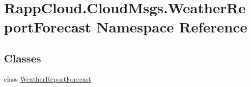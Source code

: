 \hypertarget{namespaceRappCloud_1_1CloudMsgs_1_1WeatherReportForecast}{\section{Rapp\-Cloud.\-Cloud\-Msgs.\-Weather\-Report\-Forecast Namespace Reference}
\label{namespaceRappCloud_1_1CloudMsgs_1_1WeatherReportForecast}
}
\subsection*{Classes}
\begin{DoxyCompactItemize}
\item 
class \hyperlink{classRappCloud_1_1CloudMsgs_1_1WeatherReportForecast_1_1WeatherReportForecast}{Weather\-Report\-Forecast}
\end{DoxyCompactItemize}
